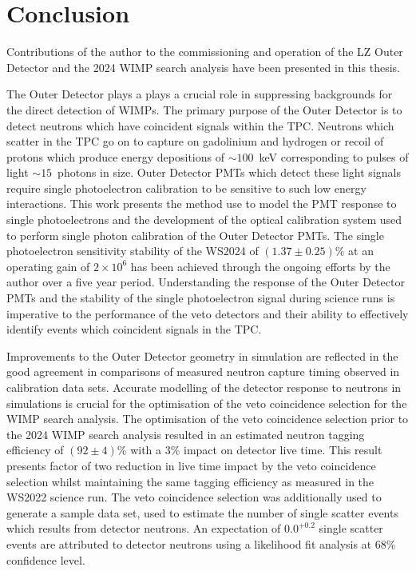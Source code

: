 \chapter{Conclusion}\label{chap:Conclusion}
Contributions of the author to the commissioning and operation of the LZ Outer Detector and the 2024 WIMP search analysis have been presented in this thesis.

The Outer Detector plays a plays a crucial role in suppressing backgrounds for the direct detection of WIMPs. The primary purpose of the Outer Detector is to detect neutrons which have coincident signals within the TPC. Neutrons which scatter in the TPC go on to capture on gadolinium and hydrogen or recoil of protons which produce energy depositions of $\sim100$~keV corresponding to pulses of light $\sim15$~photons in size. Outer Detector PMTs which detect these light signals require single photoelectron calibration to be sensitive to such low energy interactions. This work presents the method use to model the PMT response to single photoelectrons and the development of the optical calibration system used to perform single photon calibration of the Outer Detector PMTs. The single photoelectron sensitivity stability of the WS2024 of $(1.37\pm0.25)\%$ at an operating gain of $2\times10^6$ has been achieved through the ongoing efforts by the author over a five year period. Understanding the response of the Outer Detector PMTs and the stability of the single photoelectron signal during science runs is imperative to the performance of the veto detectors and their ability to effectively identify events which coincident signals in the TPC.

Improvements to the Outer Detector geometry in simulation are reflected in the good agreement in comparisons of measured neutron capture timing observed in calibration data sets. Accurate modelling of the detector response to neutrons in simulations is crucial for the optimisation of the veto coincidence selection for the WIMP search analysis. The optimisation of the veto coincidence selection prior to the 2024 WIMP search analysis resulted in an estimated neutron tagging efficiency of $(92\pm4)\%$ with a $3\%$ impact on detector live time. This result presents factor of two reduction in live time impact by the veto coincidence selection whilst maintaining the same tagging efficiency as measured in the WS2022 science run. The veto coincidence selection was additionally used to generate a sample data set, used to estimate the number of single scatter events which results from detector neutrons. An expectation of $0.0^{+0.2}$ single scatter events are attributed to detector neutrons using a likelihood fit analysis at 68\% confidence level.

